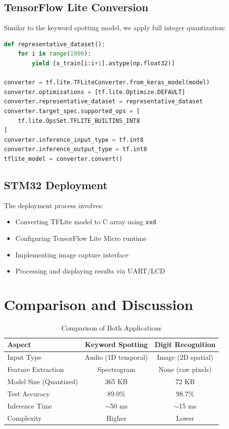 \documentclass[12pt,a4paper]{article}
\begin{document}
\subsection{TensorFlow Lite Conversion}

Similar to the keyword spotting model, we apply full integer quantization:

\begin{lstlisting}[language=Python, caption=TFLite Conversion for MNIST Model]
def representative_dataset():
    for i in range(1000):
        yield [x_train[i:i+1].astype(np.float32)]

converter = tf.lite.TFLiteConverter.from_keras_model(model)
converter.optimizations = [tf.lite.Optimize.DEFAULT]
converter.representative_dataset = representative_dataset
converter.target_spec.supported_ops = [
    tf.lite.OpsSet.TFLITE_BUILTINS_INT8
]
converter.inference_input_type = tf.int8
converter.inference_output_type = tf.int8
tflite_model = converter.convert()
\end{lstlisting}

\subsection{STM32 Deployment}

The deployment process involves:

\begin{itemize}
    \item Converting TFLite model to C array using \texttt{xxd}
    \item Configuring TensorFlow Lite Micro runtime
    \item Implementing image capture interface
    \item Processing and displaying results via UART/LCD
\end{itemize}

\section{Comparison and Discussion}

\begin{table}[H]
\centering
\caption{Comparison of Both Applications}
\begin{tabular}{lcc}
\toprule
\textbf{Aspect} & \textbf{Keyword Spotting} & \textbf{Digit Recognition} \\
\midrule
Input Type & Audio (1D temporal) & Image (2D spatial) \\
Feature Extraction & Spectrogram & None (raw pixels) \\
Model Size (Quantized) & 365 KB & 72 KB \\
Test Accuracy & 89.0\% & 98.7\% \\
Inference Time & $\sim$50 ms & $\sim$15 ms \\
Complexity & Higher & Lower \\
\bottomrule
\end{tabular}
\end{table}
\end{document}
